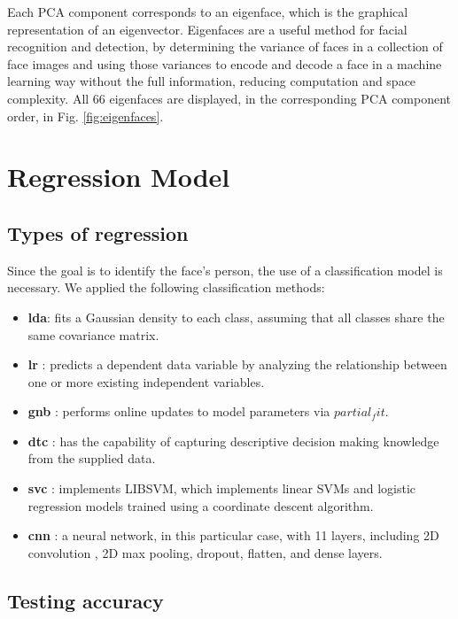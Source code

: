 \documentclass[conference]{IEEEtran}
\begin{document}
Each PCA component corresponds to an eigenface, which is the graphical representation of an eigenvector. Eigenfaces are a useful method for facial recognition and detection, by determining the variance of faces in a collection of face images and using those variances to encode and decode a face in a machine learning way without the full information, reducing computation and space complexity. All 66 eigenfaces are displayed, in the corresponding PCA component order, in Fig. \ref{fig:eigenfaces}.


\section{Regression Model}

\subsection{Types of regression}

Since the goal is to identify the face's person, the use of a classification model is necessary. We applied the following classification methods:

\begin{itemize}
  \item \textbf{\gls{lda}}\cite{linear_reg}: fits a Gaussian density to each class, assuming that all classes share the same covariance matrix.
  \item \textbf{\gls{lr}} \cite{random_forest_reg}: predicts a dependent data variable by analyzing the relationship between one or more existing independent variables.
  \item \textbf{\gls{gnb}} \cite{gaussian_nb}:  performs online updates to model parameters via $partial_fit$.
  \item \textbf{\gls{dtc}} \cite{decision_tree}: has the capability of capturing descriptive decision making knowledge from the supplied data.
  \item \textbf{\gls{svc}} \cite{svc_sklearn}: implements LIBSVM\cite{libsvm}, which implements linear SVMs and logistic regression models trained using a coordinate descent algorithm.
  \item \textbf{\gls{cnn}} \cite{cnn}: a neural network, in this particular case, with 11 layers, including 2D convolution , 2D max pooling, dropout, flatten, and dense layers.
\end{itemize}



\subsection{Testing accuracy}
\end{document}
